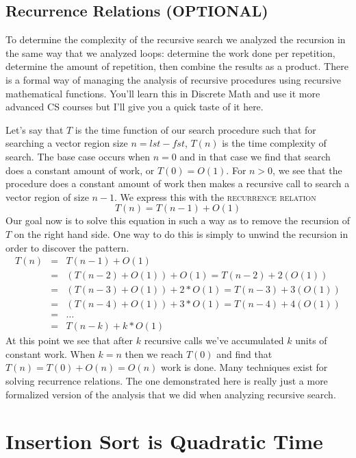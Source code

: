 \documentclass[]{tufte-handout}
\begin{document}
\subsection*{Recurrence Relations (OPTIONAL)}

To determine the complexity of the recursive search we analyzed the recursion in the same way that we analyzed loops: determine the work done per repetition, determine the amount of repetition, then combine the results as a product. There is a formal way of managing the analysis of recursive procedures using recursive mathematical functions. You'll learn this in Discrete Math and use it more advanced CS courses but I'll give you a quick taste of it here.

Let's say that $T$ is the time function of our search procedure such that for searching a vector region size $n=lst-fst$, $T(n)$ is the time complexity of search. The base case occurs when $n=0$ and in that case we find that search does a constant amount of work, or $T(0) = O(1)$. For $n>0$, we see that the procedure does a constant amount of work then makes a recursive call to search a vector region of size $n-1$. We express this with the \textsc{recurrence relation}
\[
T(n) = T(n-1) + O(1)
\]
Our goal now is to solve this equation in such a way as to remove the recursion of $T$ on the right hand side. One way to do this is simply to unwind the recursion in order to discover the pattern.
\begin{equation*}
\begin{array}{rcl}
T(n) &= & T(n-1) + O(1) \\
 &=& (T(n-2) + O(1)) + O(1) = T(n-2) + 2(O(1)) \\
 &=& (T(n-3) + O(1)) + 2*O(1) = T(n-3) + 3(O(1)) \\
 &=& (T(n-4) + O(1)) + 3*O(1) = T(n-4) + 4(O(1)) \\
 &=& \ldots \\
 &=& T(n-k) + k*O(1)
\end{array}
\end{equation*}
At this point we see that after $k$ recursive calls we've accumulated $k$ units of constant work. When $k=n$ then we reach $T(0)$ and find that $T(n) = T(0)+O(n)=O(n)$ work is done. Many techniques exist for solving recurrence relations. The one demonstrated here is really just a more formalized version of the analysis that we did when analyzing recursive search.

\section{Insertion Sort is Quadratic Time}
\end{document}

